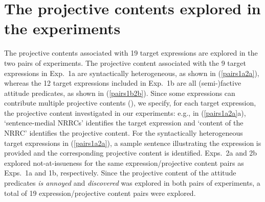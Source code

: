 \documentclass[11pt,fleqn]{article}
\newcommand{\6}{\mbox{$[\hspace*{-.6mm}[$}}
\newcommand{\9}{\mbox{$]\hspace*{-.6mm}]$}}
\begin{document}
\section{The projective contents explored in the experiments}\label{s2}

The projective contents associated with 19 target expressions are explored in the two pairs of experiments. The projective content associated with the 9 target expressions in Exp.~1a are syntactically heterogeneous, as shown in (\ref{pairs1a2a}), whereas the 12 target expressions included in Exp.~1b are all (semi-)factive attitude predicates, as shown in (\ref{pairs1b2b}). Since some expressions can contribute multiple projective contents (\citealt{brst-lang11}), we specify, for each target expression, the projective content investigated in our experiments: e.g., in (\ref{pairs1a2a}a), `sentence-medial NRRCs' identifies the target expression and `content of the NRRC' identifies the projective content. For the syntactically heterogeneous target expressions in (\ref{pairs1a2a}), a sample sentence illustrating the expression is provided and the corresponding projective content is identified. Exps.~2a and 2b explored not-at-issueness for the same expression/projective content pairs as Exps.~1a and 1b, respectively. Since the projective content of the attitude predicates {\em is annoyed} and {\em discovered} was explored in both pairs of experiments, a total of 19 expression/projective content pairs were explored. 
\end{document}
